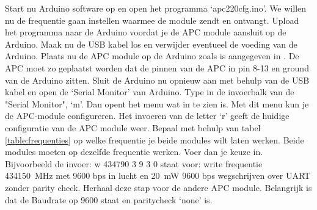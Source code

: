 Start nu Arduino software op en open het programma `apc220cfg.ino'. We
willen nu de frequentie gaan instellen waarmee de module zendt en
ontvangt. Upload het programma naar de Arduino voordat je de APC module
aansluit op de Arduino. Maak nu de USB kabel los en verwijder eventueel
de voeding van de Arduino. Plaats nu de APC module op de Arduino zoals
is aangegeven in . De APC moet zo
geplaatst worden dat de pinnen van de APC in pin 8-13 en ground van de
Arduino zitten. Sluit de Arduino nu opnieuw aan met behulp van de USB
kabel en open de `Serial Monitor' van Arduino. Type in de invoerbalk van
de "Serial Monitor", `m'. Dan opent het menu wat in
 te zien is. Met dit menu kun je de APC-module
configureren. Het invoeren van de letter `r' geeft de huidige
configuratie van de APC module weer. Bepaal met behulp van tabel
\ref{table:frequenties} op welke frequentie je beide modules wilt laten
werken. Beide modules moeten op dezelfde frequentie werken. Voer dan je
keuze in. Bijvoorbeeld de invoer: w 434790 3 9 3 0 staat voor: write
frequentie \SI{434150}{\MHz} met 9600 bps in lucht en
\SI{20}{\milli\watt} 9600 bps wegschrijven over UART zonder parity check.
Herhaal deze stap voor de andere APC module. Belangrijk is dat de Baudrate op 
9600 staat en paritycheck `none' is.



